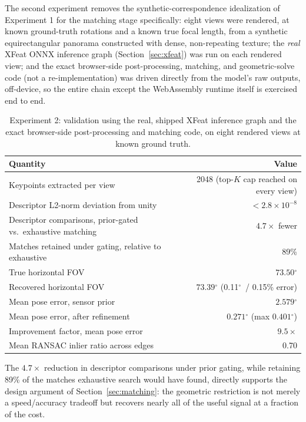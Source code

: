 \documentclass[11pt]{article}
\newcommand{\Deg}{\ensuremath{^{\circ}}}
\begin{document}
The second experiment removes the synthetic-correspondence idealization of Experiment 1 for the matching stage specifically: eight views were rendered, at known ground-truth rotations and a known true focal length, from a synthetic equirectangular panorama constructed with dense, non-repeating texture; the \emph{real} XFeat ONNX inference graph (Section~\ref{sec:xfeat}) was run on each rendered view; and the exact browser-side post-processing, matching, and geometric-solve code (not a re-implementation) was driven directly from the model's raw outputs, off-device, so the entire chain except the WebAssembly runtime itself is exercised end to end.

\begin{table}[h]
\centering
\small
\begin{tabular}{@{}lr@{}}
\toprule
\textbf{Quantity} & \textbf{Value} \\
\midrule
Keypoints extracted per view & 2048 (top-$K$ cap reached on every view) \\
Descriptor L2-norm deviation from unity & $<2.8\times10^{-8}$ \\
Descriptor comparisons, prior-gated vs.\ exhaustive matching & $4.7\times$ fewer \\
Matches retained under gating, relative to exhaustive & 89\% \\
True horizontal FOV & $73.50\Deg$ \\
Recovered horizontal FOV & $73.39\Deg$ (0.11\Deg\ / 0.15\% error) \\
Mean pose error, sensor prior & $2.579\Deg$ \\
Mean pose error, after refinement & $0.271\Deg$ (max $0.401\Deg$) \\
Improvement factor, mean pose error & $9.5\times$ \\
Mean RANSAC inlier ratio across edges & 0.70 \\
\bottomrule
\end{tabular}
\caption{Experiment 2: validation using the real, shipped XFeat inference graph and the exact browser-side post-processing and matching code, on eight rendered views at known ground truth.}
\label{tab:exp2}
\end{table}

The $4.7\times$ reduction in descriptor comparisons under prior gating, while retaining 89\% of the matches exhaustive search would have found, directly supports the design argument of Section~\ref{sec:matching}: the geometric restriction is not merely a speed/accuracy tradeoff but recovers nearly all of the useful signal at a fraction of the cost.
\end{document}
